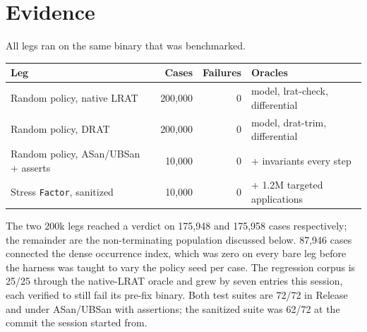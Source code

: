 \documentclass[11pt]{article}
\newcommand{\code}[1]{\texttt{#1}}
\begin{document}
\section*{Evidence}
All legs ran on the same binary that was benchmarked.

\begin{center}
\begin{tabular}{lrrl}
\toprule
Leg & Cases & Failures & Oracles \\
\midrule
Random policy, native LRAT & 200{,}000 & 0 & model, lrat-check, differential \\
Random policy, DRAT & 200{,}000 & 0 & model, drat-trim, differential \\
Random policy, ASan/UBSan + asserts & 10{,}000 & 0 & + invariants every step \\
Stress \code{Factor}, sanitized & 10{,}000 & 0 & + 1.2M targeted applications \\
\bottomrule
\end{tabular}
\end{center}

The two 200k legs reached a verdict on 175{,}948 and 175{,}958 cases
respectively; the remainder are the non-terminating population discussed below.
87{,}946 cases connected the dense occurrence index, which was zero on every
bare leg before the harness was taught to vary the policy seed per case.  The
regression corpus is 25/25 through the native-LRAT oracle and grew by seven
entries this session, each verified to still fail its pre-fix binary.  Both
test suites are 72/72 in Release and under ASan/UBSan with assertions; the
sanitized suite was 62/72 at the commit the session started from.
\end{document}
